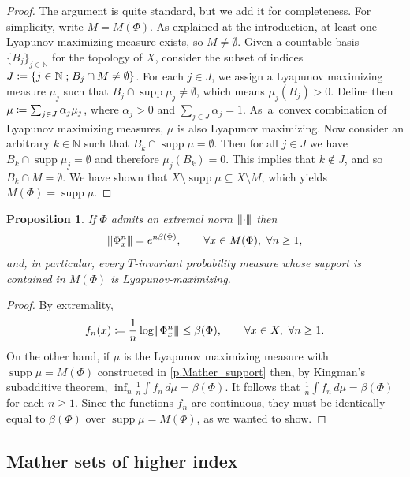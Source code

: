 \documentclass[10pt]{amsart}
\def\vcentcolon{\mathrel{\mathop\ordinarycolon}}
\providecommand\ordinarycolon{:}
\providecommand*\coloneqq{\vcentcolon\mathrel{\mkern-1.2mu}=}
\theoremstyle{plain}
\newtheorem{proposition}[theorem]{Proposition}
\theoremstyle{definition}
\newcommand{\tribar}[1]{\mathopen{| {\kern -1.5pt} | {\kern -1.5pt} |} {#1}
\mathclose{| {\kern -1.5pt} | {\kern -1.5pt} |}}
\newcommand{\NN}{\mathbb{N}}
\newcommand{\st}{\;\mathord{;}\;}
\DeclareMathOperator{\supp}{supp}
\begin{document}
\begin{proof}
The argument is quite standard, but we add it for completeness.
For simplicity, write $M = M(\Phi)$.
As explained at the introduction, at least one Lyapunov maximizing measure exists, so $M \neq \emptyset$.
Given a countable basis $\{B_j\}_{j\in\NN}$ for the topology of $X$, consider the subset of indices $ J \coloneqq \{ j \in \NN \st B_j \cap M \neq \emptyset \} $.
For each $ j \in J $, we assign a Lyapunov maximizing measure $\mu_j$ such that $B_j \cap \supp \mu_j \neq \emptyset $, which means $\mu_j(B_j)>0$.
Define then $ \mu\coloneqq\sum_{j \in J} \alpha_j \mu_j$, where $ \alpha_j>0$ and $ \sum_{j \in J} \alpha_j = 1 $. As~a~convex combination of Lyapunov maximizing measures, $ \mu$ is also Lyapunov maximizing.
Now consider an arbitrary $k \in \NN$ such that $B_k \cap \supp \mu = \emptyset $.
Then for all $ j \in J $ we have $B_k \cap \supp \mu_j = \emptyset $ and therefore $\mu_j(B_k)=0$.
This implies that $k\not\in J$, and so $B_k \cap M = \emptyset$.
We have shown that $ X \setminus \supp \mu \subseteq X \setminus M$, which yields $M(\Phi) = \supp \mu$.
\end{proof}

\begin{proposition}\label{p.Mather_calibration}
If $\Phi$ admits an extremal norm $ \tribar{\cdot}$ then
\begin{equation*}
\tribar{\Phi_x^n} = e^{n \beta(\Phi)}, \qquad \forall x \in M(\Phi),\ \forall n \ge 1,
\end{equation*}
and, in particular, every $T$-invariant probability measure whose support is contained in $M(\Phi)$ is Lyapunov-maximizing.
\end{proposition}

\begin{proof}
By extremality,
\[
f_n(x) \coloneqq \frac{1}{n}\log \tribar{\Phi_x^n} \le \beta(\Phi), \qquad \forall x \in X,\ \forall n \ge 1.
\]
On the other hand, if $\mu$ is the Lyapunov maximizing measure with $\supp \mu = M(\Phi)$ constructed in \cref{p.Mather_support} then, by Kingman's subadditive theorem,
$ \inf_n \frac{1}{n} \int f_n \, d\mu = \beta(\Phi) $.
It follows that $\frac{1}{n} \int f_n \, d\mu = \beta(\Phi)$ for each $n \ge 1$.
Since the functions $f_n$ are continuous, they must be identically equal to $\beta(\Phi)$ over $\supp \mu = M(\Phi)$,
as we wanted to show.
\end{proof}

\subsection{Mather sets of higher index} \label{ss.other_Mathers}
\end{document}
